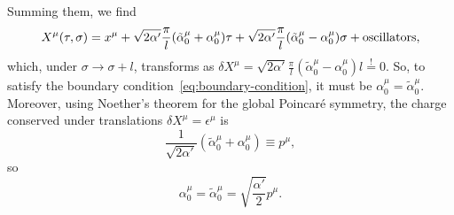 Summing them, we find
\begin{equation}\label{eq:generic-expansion}
    X^\mu (\tau,\sigma) = x^\mu + \sqrt{2\alpha'} \frac{\pi}{l} (\tilde{\alpha}^\mu_0 + \alpha^\mu_0) \tau + \sqrt{2\alpha'} \frac{\pi}{l} (\tilde{\alpha}^\mu_0 - \alpha^\mu_0) \sigma + \textup{oscillators},
\end{equation}
which, under $\sigma \to \sigma + l$, transforms as $\delta X^\mu = \sqrt{2\alpha'}\frac{\pi}{l}(\tilde{\alpha}^\mu_0 - \alpha^\mu_0) l \overset{\mathrm{!}}{=} 0$. So, to satisfy the boundary condition~\eqref{eq:boundary-condition}, it must be $\alpha^\mu_0 = \tilde{\alpha}^\mu_0$. Moreover, using Noether's theorem for the global Poincaré symmetry, the charge conserved under translations $\delta X^\mu = \epsilon^\mu$ is 
\begin{equation}\label{eq:noteher-momentum}
    \frac{1}{\sqrt{2\alpha'}} (\tilde{\alpha}^\mu_0 + \alpha^\mu_0) \equiv p^\mu,
\end{equation}
so
\begin{equation}\label{eq:relation-alpha-momentum}
    \alpha^\mu_0 = \tilde{\alpha}^\mu_0 = \sqrt{\frac{\alpha'}{2}}p^\mu .
\end{equation}

